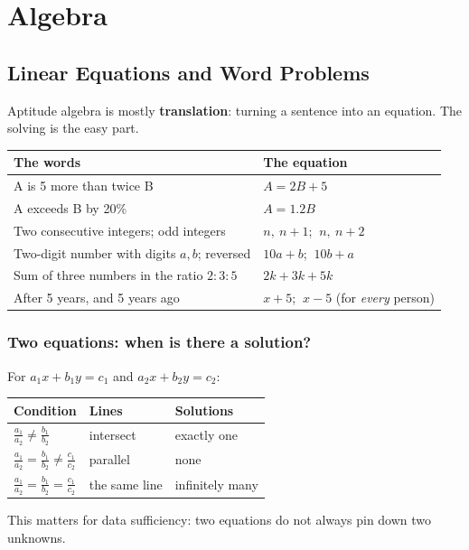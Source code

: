 \documentclass[11pt,a4paper,openany]{report}
\begin{document}
\part{Algebra}
\chapter{Linear Equations and Word Problems}\label{ch:lin}

Aptitude algebra is mostly \textbf{translation}: turning a sentence into an equation. The solving is the easy part.

\begin{center}\small
\begin{tabular}{>{\raggedright}p{6.4cm}>{\raggedright\arraybackslash}p{7cm}}
\toprule
The words & The equation\\\midrule
A is 5 more than twice B & $A=2B+5$\\
A exceeds B by 20\% & $A=1.2B$\\
Two consecutive integers; odd integers & $n,\ n+1$; $\ n,\ n+2$\\
Two-digit number with digits $a,b$; reversed & $10a+b$; $\ 10b+a$\\
Sum of three numbers in the ratio $2:3:5$ & $2k+3k+5k$\\
After 5 years, and 5 years ago & $x+5$; $\ x-5$ (for \emph{every} person)\\
\bottomrule
\end{tabular}
\end{center}

\section{Two equations: when is there a solution?}
For $a_1x+b_1y=c_1$ and $a_2x+b_2y=c_2$:
\begin{center}\small
\begin{tabular}{lll}
\toprule
Condition & Lines & Solutions\\\midrule
$\frac{a_1}{a_2}\neq\frac{b_1}{b_2}$ & intersect & exactly one\\
$\frac{a_1}{a_2}=\frac{b_1}{b_2}\neq\frac{c_1}{c_2}$ & parallel & none\\
$\frac{a_1}{a_2}=\frac{b_1}{b_2}=\frac{c_1}{c_2}$ & the same line & infinitely many\\
\bottomrule
\end{tabular}
\end{center}
This matters for data sufficiency: two equations do not always pin down two unknowns.
\end{document}
